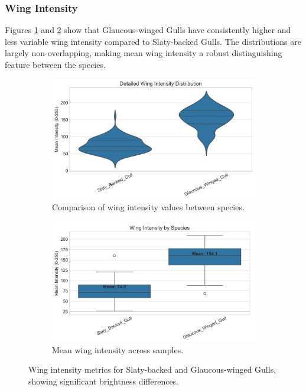 \documentclass[a4paper,12pt]{report}
\begin{document}
\subsubsection{Wing Intensity}
Figures \ref{fig:wing_intensity} and \ref{fig:wing_intensity_means} show that Glaucous-winged Gulls have consistently higher and less variable wing intensity compared to Slaty-backed Gulls. The distributions are largely non-overlapping, making mean wing intensity a robust distinguishing feature between the species.

\begin{figure}[H]
    \centering
    \begin{subfigure}[b]{0.44\textwidth}
        \centering
        \includegraphics[width=\textwidth]{images/REPORT_IMAGES_INTENSITY/I2/wing_intensity_analysis.png}
        \caption{Comparison of wing intensity values between species.}
        \label{fig:wing_intensity}
    \end{subfigure}
    \hfill
    \begin{subfigure}[b]{0.44\textwidth}
        \centering
        \includegraphics[width=\textwidth]{images/REPORT_IMAGES_INTENSITY/I2/WINGINTENSITY.png}
        \caption{Mean wing intensity across samples.}
        \label{fig:wing_intensity_means}
    \end{subfigure}
    \caption{Wing intensity metrics for Slaty-backed and Glaucous-winged Gulls, showing significant brightness differences.}
    \label{fig:wing_intensity_combined}
\end{figure}
\end{document}

